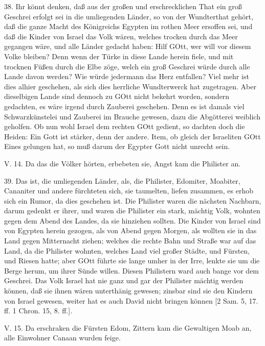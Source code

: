 38. Ihr könnt denken, daß aus der großen und erschrecklichen That ein groß Geschrei erfolgt sei in die umliegenden Länder, so von der Wundterthat gehört, daß die ganze Macht des Königreichs Egypten im rothen Meer ersoffen sei, und daß die Kinder von Israel das Volk wären, welches trocken durch das Meer gegangen wäre, und alle Länder gedacht haben: Hilf GOtt, wer will vor diesem Volke bleiben? Denn wenn der Türke in diese Lande herein fiele, und mit trocknen Füßen durch die Elbe zöge, welch ein groß Geschrei würde durch alle Lande davon werden? Wie würde jedermann das Herz entfallen? Viel mehr ist dies alhier geschehen, als sich dies herrliche Wundterwerck hat zugetragen. Aber dieselbigen Lande sind dennoch zu GOtt nicht bekehrt worden, sondern gedachten, es wäre irgend durch Zauberei geschehen. Denn es ist damals viel Schwarzkünstelei und Zauberei im Brauche gewesen, dazu die Abgötterei weiblich geholfen. Ob nun wohl Israel
dem rechten GOtt gedient, so dachten doch die Heiden: Ein Gott ist stärker, denn der andere. Item, ob gleich der Israeliten GOtt Eines gelungen hat, so muß darum der Egypter Gott nicht unrecht sein.

\begin{schriftzitat}
V. 14. Da das die Völker hörten, erbebeten sie, Angst kam die Philister an.
\end{schriftzitat}

39. Das ist, die umliegenden Länder, als, die Philister, Edomiter, Moabiter, Cananiter und andere fürchteten sich, sie taumelten, liefen zusammen, es erhob sich ein Rumor, da dies geschehen ist. Die Philister waren die nächsten Nachbarn, darum gedenkt er ihrer, und waren die Philister ein stark, mächtig Volk, wohnten gegen dem Abend des Landes, da sie hinziehen sollten. Die Kinder von Israel sind von Egypten herein gezogen, als von Abend gegen Morgen, als wollten sie in das Land gegen Mitternacht ziehen; welches die rechte Bahn und Straße war auf das Land, da die Philister wohnten, welches Land viel großer Städte, und Fürsten, und Riesen hatte; aber GOtt führte sie lange umher in der Irre, lenkte sie um die Berge herum, um ihrer Sünde willen. Diesen Philistern ward auch bange vor dem Geschrei. Das Volk Israel hat nie ganz und gar der Philister mächtig werden können, daß sie ihnen wären unterthänig gewesen; zinsbar sind sie den Kindern von Israel gewesen, weiter hat es auch David nicht bringen können [2 Sam. 5, 17. ff. 1 Chron. 15, 8. ff.].

\begin{schriftzitat}
V. 15. Da erschraken die Fürsten Edom, Zittern kam die Gewaltigen Moab an, alle Einwohner Canaan wurden feige.
\end{schriftzitat}

